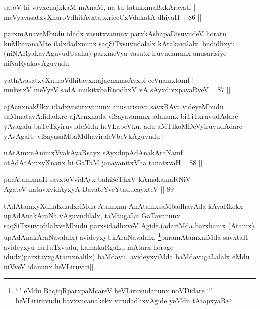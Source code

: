 \begin{shl}
satoV hi vayxcnajxkaM mAnaM, na tu tatukxmaBxkAravatf |\\
meVyavasatxvXnuroVdhitAvxtapxriceCxVdakatA dhiyaH \hfill || 86 ||
\end{shl}

\begin{artha}
parxmAnaveMbudu idadx vasutxvanunx parxkAshapaDisuvudeV horatu kuMbaranaMte ilalxdadxnunx 
saqSiTxsuvudalalx kArakavalalx. budidhxyu (niNARyakavAguvudUsaha) parxmeVya vasutx 
iruvudanunx anusarisiye niNaRyakavAguvudu.
\end{artha}

\begin{shl}
yathAvasatxvXnuroVdhitavxmajacnxnasAyxpi ceVnamxtamf |\\
muketxV meVyeV sadA mukitxbaRnodhxV vA sAyxdivxpayaRyeV \hfill || 87 ||
\end{shl}

\begin{artha}
ajAcnxnakUkx idadxvasutxvanunx anusarisuva savxBAva videyeMbudu saMmatavAdidadxre ajAcnxnada viSayavanunx adanunx biTiTxruvudAdare yAvagalu baTeTxyiruvudeMdu heVLabeVku. adu aMTikoMDeVyiruvudAdare yAvAgalU viSayasaMbaMdhaviraleVbeVkAguvudu||
\end{artha}


\begin{shl}
nA\s \s tAmx\s nAnimxVyakAyaRsayx sAyxdupAdAnakAraNamf |\\
atAdAtAmxyXnanx hi GaTaM janayanitxVha tanatxvaH \hfill || 88 ||
\end{shl}

\begin{shl}
parAtamxnaH savxtoV\s vidAyx bahiSeThxV kAmakamaRNiV |\\
AgateV natavxvidAyxyA BavateYveYtaducayxteV \hfill || 89 ||
\end{shl}

\begin{artha}
tAdAtamxyXdilalxdadxriMda Atamxnu AnAtamxsaMbadhavAda kAyaRkekx upAdAnakAraNa vAguvudilalx, taMtugaLu GaTavanunx saqSiTxsuvudilalxveMbudu parxsidadhxveV Agide.(adariMda barxhamx (Atamx) upAdAnakAraNavalalx) avideyxyUkAraNavalalx, \footnote{``\stext" eMdu BaqtqRparxpaMcareV heVLiruvudanunx noVDidare ``\stext" heVLiriruvudu bavxvacanakekx virudadhxvAgide yeMdu tAtapxyaR}paramAtamxniMda savxtaH avideyxyu huTuTxvudu, kamakaRgaLu mAtarx horage idudx(parxtayxgAtamxnalilx) baMdavu. avideyxyiMda baMdavugaLalalx eMdu niVveV idanunx heVLiruviri||
\end{artha}

